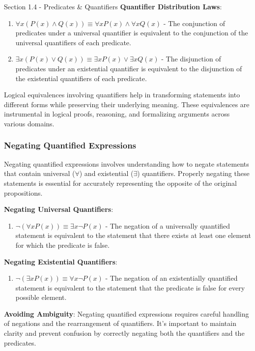 \begin{notes}{Section 1.4 - Predicates \& Quantifiers}
    \textbf{Quantifier Distribution Laws}:
    \begin{enumerate}
        \item \(\forall x (P(x) \land Q(x)) \equiv \forall x P(x) \land \forall x Q(x)\) - The conjunction of predicates under a universal quantifier is equivalent to the conjunction of the universal quantifiers of each predicate.
        \item \(\exists x (P(x) \lor Q(x)) \equiv \exists x P(x) \lor \exists x Q(x)\) - The disjunction of predicates under an existential quantifier is equivalent to the disjunction of the existential quantifiers of each predicate.
    \end{enumerate}
    
    Logical equivalences involving quantifiers help in transforming statements into different forms while preserving their underlying meaning. These equivalences are instrumental in logical proofs, reasoning, and formalizing arguments across various domains.
    

    \subsubsection*{Negating Quantified Expressions}

    Negating quantified expressions involves understanding how to negate statements that contain universal (\(\forall\)) and existential (\(\exists\)) quantifiers. Properly negating these statements is essential for accurately representing the opposite of 
    the original propositions.
    
    \textbf{Negating Universal Quantifiers}:
    \begin{enumerate}
        \item \(\neg (\forall x P(x)) \equiv \exists x \neg P(x)\) - The negation of a universally quantified statement is equivalent to the statement that there exists at least one element for which the predicate is false.
    \end{enumerate}
    
    \textbf{Negating Existential Quantifiers}:
    \begin{enumerate}
        \item \(\neg (\exists x P(x)) \equiv \forall x \neg P(x)\) - The negation of an existentially quantified statement is equivalent to the statement that the predicate is false for every possible element.
    \end{enumerate}
    
    \textbf{Avoiding Ambiguity}: Negating quantified expressions requires careful handling of negations and the rearrangement of quantifiers. It's important to maintain clarity and prevent confusion by correctly negating both the quantifiers and the predicates.
    

\end{notes}

